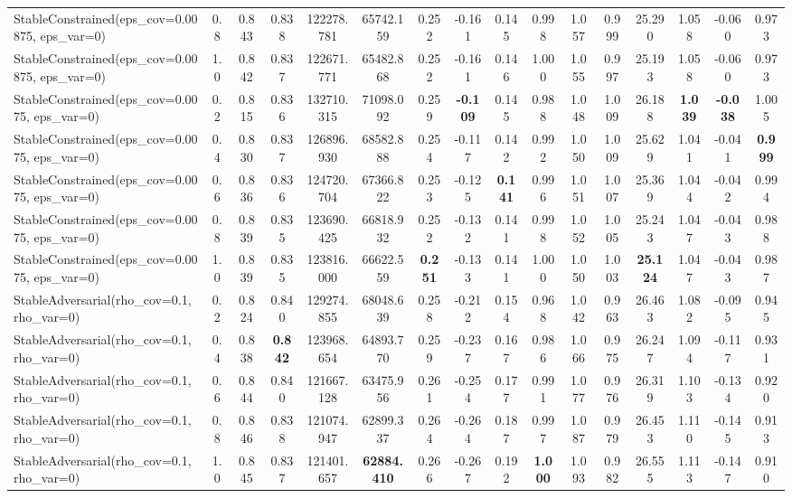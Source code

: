 \documentclass[11pt]{article}
\theoremstyle{plain}
\theoremstyle{definition}
\newcommand{\1}{\mathbf{1}}
\begin{document}
\begin{table}[!h]
{\begin{tabular}{lccccccccccccccc}
StableConstrained(eps\_cov=0.00875, eps\_var=0) & 0.8 & 0.843 & 0.838 & 122278.781 & 65742.159 & 0.252 & -0.161 & 0.145 & 0.998 & 1.057 & 0.999 & 25.290 & 1.058 & -0.060 & 0.973 \\
StableConstrained(eps\_cov=0.00875, eps\_var=0) & 1.0 & 0.842 & 0.837 & 122671.771 & 65482.868 & 0.252 & -0.161 & 0.146 & 1.000 & 1.055 & 0.997 & 25.193 & 1.058 & -0.060 & 0.973 \\
StableConstrained(eps\_cov=0.0075, eps\_var=0) & 0.2 & 0.815 & 0.836 & 132710.315 & 71098.092 & 0.259 & \textbf{-0.109} & 0.145 & 0.988 & 1.048 & 1.009 & 26.188 & \textbf{1.039} & \textbf{-0.038} & 1.005 \\
StableConstrained(eps\_cov=0.0075, eps\_var=0) & 0.4 & 0.830 & 0.837 & 126896.930 & 68582.888 & 0.254 & -0.117 & 0.142 & 0.992 & 1.050 & 1.009 & 25.629 & 1.041 & -0.041 & \textbf{0.999} \\
StableConstrained(eps\_cov=0.0075, eps\_var=0) & 0.6 & 0.836 & 0.836 & 124720.704 & 67366.822 & 0.253 & -0.125 & \textbf{0.141} & 0.996 & 1.051 & 1.007 & 25.369 & 1.044 & -0.042 & 0.994 \\
StableConstrained(eps\_cov=0.0075, eps\_var=0) & 0.8 & 0.839 & 0.835 & 123690.425 & 66818.932 & 0.252 & -0.132 & 0.141 & 0.998 & 1.052 & 1.005 & 25.243 & 1.047 & -0.043 & 0.988 \\
StableConstrained(eps\_cov=0.0075, eps\_var=0) & 1.0 & 0.839 & 0.835 & 123816.000 & 66622.559 & \textbf{0.251} & -0.133 & 0.141 & 1.000 & 1.050 & 1.003 & \textbf{25.124} & 1.047 & -0.043 & 0.987 \\
StableAdversarial(rho\_cov=0.1, rho\_var=0) & 0.2 & 0.824 & 0.840 & 129274.855 & 68048.639 & 0.258 & -0.212 & 0.154 & 0.968 & 1.042 & 0.963 & 26.463 & 1.082 & -0.095 & 0.945 \\
StableAdversarial(rho\_cov=0.1, rho\_var=0) & 0.4 & 0.838 & \textbf{0.842} & 123968.654 & 64893.770 & 0.259 & -0.237 & 0.167 & 0.986 & 1.066 & 0.975 & 26.247 & 1.094 & -0.117 & 0.931 \\
StableAdversarial(rho\_cov=0.1, rho\_var=0) & 0.6 & 0.844 & 0.840 & 121667.128 & 63475.956 & 0.261 & -0.254 & 0.177 & 0.991 & 1.077 & 0.976 & 26.319 & 1.103 & -0.134 & 0.920 \\
StableAdversarial(rho\_cov=0.1, rho\_var=0) & 0.8 & 0.846 & 0.838 & 121074.947 & 62899.337 & 0.264 & -0.264 & 0.187 & 0.997 & 1.087 & 0.979 & 26.453 & 1.110 & -0.145 & 0.913 \\
StableAdversarial(rho\_cov=0.1, rho\_var=0) & 1.0 & 0.845 & 0.837 & 121401.657 & \textbf{62884.410} & 0.266 & -0.267 & 0.192 & \textbf{1.000} & 1.093 & 0.982 & 26.555 & 1.113 & -0.147 & 0.910 \\

\end{tabular}}
\end{table}
\end{document}
